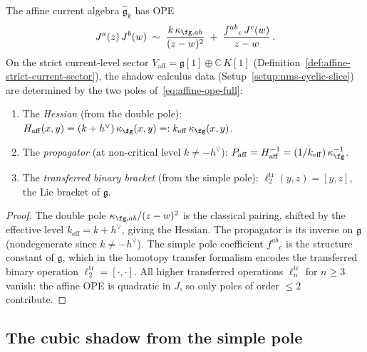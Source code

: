 \begin{proposition}\label{prop:affine-cyclic-slice-data}
The affine current algebra $\widehat{\mathfrak{g}}_k$ has OPE
\begin{equation}\label{eq:affine-ope-full}
J^a(z)\,J^b(w)
\;\sim\;
\frac{k\,\kappa_{\fg,ab}}{(z-w)^2}
\;+\;
\frac{f^{ab}{}_{c}\,J^c(w)}{z-w}\,.
\end{equation}
On the strict current-level sector
$V_{\mathrm{aff}} = \mathfrak{g}[1] \oplus \mathbb{C}\,K[1]$
\textup{(Definition~\textup{\ref{def:affine-strict-current-sector}})},
the shadow calculus data
\textup{(Setup~\textup{\ref{setup:nms-cyclic-slice}})} are
determined by the two poles of~\eqref{eq:affine-ope-full}:
\begin{enumerate}[label=\textup{(\roman*)}]
\item The \emph{Hessian} \textup{(from the double pole)}:
 $H_{\mathrm{aff}}(x,y) = (k + h^\vee)\,\kappa_{\fg}(x,y)
 =: k_{\mathrm{eff}}\,\kappa_{\fg}(x,y)$.
\item The \emph{propagator}
 \textup{(at non-critical level $k \neq -h^\vee$)}:
 $P_{\mathrm{aff}} = H_{\mathrm{aff}}^{-1}
 = (1/k_{\mathrm{eff}})\,\kappa_{\fg}^{-1}$.
\item The \emph{transferred binary bracket}
 \textup{(from the simple pole)}:
 $\ell_2^{\mathrm{tr}}(y,z) = [y,z]$, the Lie bracket of
 $\mathfrak{g}$.
\end{enumerate}
\end{proposition}

\begin{proof}
The double pole $\kappa_{\fg,ab}/(z-w)^2$ is the classical pairing,
shifted by the effective level $k_{\mathrm{eff}} = k + h^\vee$,
giving the Hessian. The propagator is its inverse on
$\mathfrak{g}$ (nondegenerate since $k \neq -h^\vee$). The
simple pole coefficient $f^{ab}{}_{c}$ is the structure constant
of $\mathfrak{g}$, which in the homotopy transfer formalism
encodes the transferred binary operation
$\ell_2^{\mathrm{tr}} = [\cdot,\cdot]$. All higher transferred
operations $\ell_n^{\mathrm{tr}}$ for $n \ge 3$ vanish: the affine
OPE is quadratic in $J$, so only poles of order $\le 2$ contribute.
\end{proof}

\subsection{The cubic shadow from the simple pole}
\label{subsec:affine-cubic-from-simple-pole}

